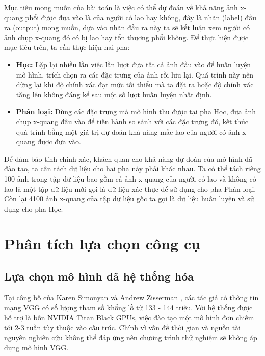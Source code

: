 Mục tiêu mong muốn của bài toán là việc có thể dự đoán về khả năng ảnh x-quang phổi được đưa vào là của người có lao hay không, đây là nhãn (label) đầu ra (output) mong muốn, dựa vào nhãn đầu ra này ta sẽ kết luận xem người có ảnh chụp x-quang đó có bị lao hay tổn thương phổi không. Để thực hiện được mục tiêu trên, ta cần thực hiện hai pha:
\begin{itemize}
	\item \textbf{Học:} Lặp lại nhiều lần việc lần lượt đưa tất cả ảnh đầu vào để huấn luyện mô hình, trích chọn ra các đặc trưng của ảnh rồi lưu lại. Quá trình này nên dừng lại khi độ chính xác đạt mức tối thiểu mà ta đặt ra hoặc độ chính xác tăng lên không đáng kể sau một số lượt huấn luyện nhất định. 
	\item \textbf{Phân loại:} Dùng các đặc trưng mà mô hình thu được tại pha Học, đưa ảnh chụp x-quang đầu vào để tiến hành so sánh với các đặc trưng đó, kết thúc quá trình bằng một giá trị dự đoán khả năng mắc lao của người có ảnh x-quang được đưa vào.
\end{itemize}

Để đảm bảo tính chính xác, khách quan cho khả năng dự đoán của mô hình đã đào tạo, ta cần tách dữ liệu cho hai pha này phải khác nhau. Ta có thể tách riêng 100 ảnh trong tập dữ liệu bao gồm cả ảnh x-quang của người có lao và không có lao là một tập dữ liệu mới gọi là dữ liệu xác thực để sử dụng cho pha Phân loại. Còn lại 4100 ảnh x-quang của tập dữ liệu gốc ta gọi là dữ liệu huấn luyện và sử dụng cho pha Học.

\section{Phân tích lựa chọn công cụ}
\subsection{Lựa chọn mô hình đã hệ thống hóa}
Tại công bố của Karen Simonyan và Andrew Zisserman \cite{vgg16}, các tác giả có thông tin mạng VGG có số lượng tham số khổng lồ từ 133 - 144 triệu. Với hệ thống được hỗ trợ là bốn NVIDIA Titan Black GPUs, việc đào tạo một mô hình đơn chiếm tới 2-3 tuần tùy thuộc vào cấu trúc. Chính vì vấn đề thời gian và nguồn tài nguyên nghiên cứu không thể đáp ứng nên chương trình thử nghiệm sẽ không áp dụng mô hình VGG.
 
